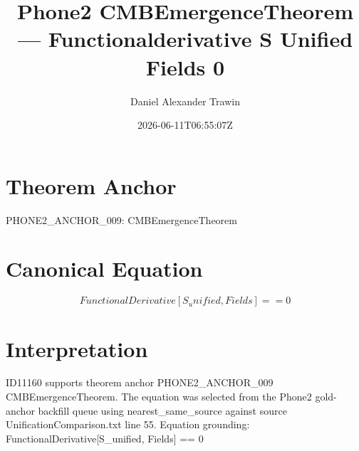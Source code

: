 \documentclass[11pt]{article}
\title{Phone2 CMBEmergenceTheorem — Functionalderivative S Unified Fields 0}
\author{Daniel Alexander Trawin}
\date{2026-06-11T06:55:07Z}
\begin{document}
\maketitle
\section*{Theorem Anchor}
PHONE2_ANCHOR_009: CMBEmergenceTheorem
\section*{Canonical Equation}
\[
FunctionalDerivative[S_unified, Fields] == 0
\]
\section*{Interpretation}
ID11160 supports theorem anchor PHONE2_ANCHOR_009 CMBEmergenceTheorem. The equation was selected from the Phone2 gold-anchor backfill queue using nearest_same_source against source UnificationComparison.txt line 55. Equation grounding: FunctionalDerivative[S_unified, Fields] == 0
\end{document}
